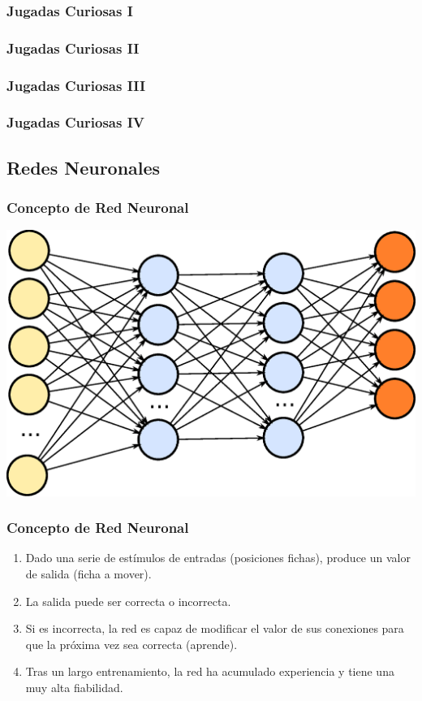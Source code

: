\documentclass[a4paper,t,xcolor=pst,dvips,colortheme]{beamer}
\begin{document}
\begin{frame}[c]
    \frametitle{Jugadas Curiosas I}
\end{frame}

\begin{frame}[c]
    \frametitle{Jugadas Curiosas II}
\end{frame}

\begin{frame}[c]
    \frametitle{Jugadas Curiosas III}
\end{frame}

\begin{frame}[c]
    \frametitle{Jugadas Curiosas IV}
\end{frame}

\subsection{Redes Neuronales}

\begin{frame}[c]
    \frametitle{Concepto de Red Neuronal}
    \begin{center}
        \includegraphics[width=0.85\linewidth]{images/neural/neuralNetwork.eps}
    \end{center}
\end{frame}

\begin{frame}[c]
    \frametitle{Concepto de Red Neuronal}
    \begin{enumerate}[<+->]
        \item Dado una serie de estímulos de entradas (posiciones fichas), produce un valor de salida (ficha a mover).
        \item La salida puede ser correcta o incorrecta. 
        \item Si es incorrecta, la red es capaz de modificar el valor de sus conexiones para que la próxima vez sea correcta (aprende).
        \item Tras un largo entrenamiento, la red ha acumulado experiencia y tiene una muy alta fiabilidad.
    \end{enumerate}
\end{frame}
\end{document}
